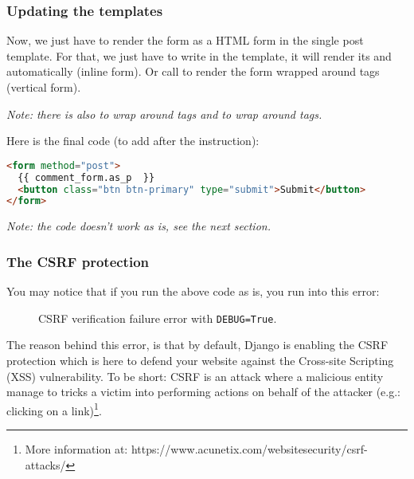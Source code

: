     \subsubsection{Updating the templates}
        Now, we just have to render the form as a HTML form in the single post template.
        For that, we just have to write  in the template, 
        it will render its  and  automatically (inline form).
        Or call  to render the form wrapped around  
        tags (vertical form).
        
        \emph{
            Note: there is also  to wrap around  tags
            and  to wrap around  tags.}
            
        Here is the final code (to add after the  instruction):
        \begin{lstlisting}[language=html, numbers=none, title=blog/templates/post\textunderscore single.html]
<form method="post">
  {{ comment_form.as_p  }}
  <button class="btn btn-primary" type="submit">Submit</button>
</form>
        \end{lstlisting}
        
        \emph{Note: the code doesn't work as is, see the next section.}
        \newpage
    
    \subsubsection{The CSRF protection}
        You may notice that if you run the above code as is, you run into this error:
        \begin{figure}[H]
            \centering
            \caption{CSRF verification failure error with \texttt{DEBUG=True}.}
        \end{figure}
        
        The reason behind this error, is that by default, Django is enabling the CSRF protection
        which is here to defend your website against the Cross-site Scripting (XSS) vulnerability.
        To be short: CSRF is an attack where a malicious entity manage to tricks
        a victim into performing actions on behalf of the attacker (e.g.: clicking on a link)\footnote{
            More information at: https://www.acunetix.com/websitesecurity/csrf-attacks/}.
        
